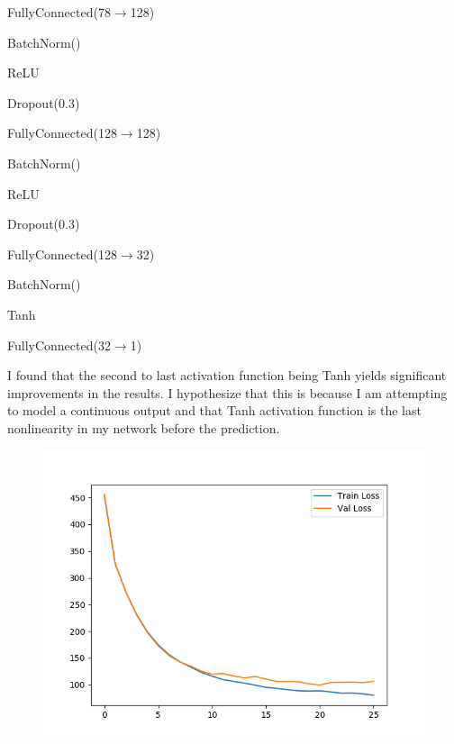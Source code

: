 \documentclass[12pt]{article}
\newcommand{\ra}{\ensuremath{\rightarrow}}
\begin{document}
        \begin{center}
            FullyConnected(78$\ra$128)

            BatchNorm()

            ReLU

            Dropout(0.3)

            FullyConnected(128$\ra$128)

            BatchNorm()

            ReLU

            Dropout(0.3)

            FullyConnected(128$\ra$32)

            BatchNorm()

            Tanh

            FullyConnected(32$\ra$1)

        \end{center}

    I found that the second to last activation function being Tanh yields significant improvements in the results. I hypothesize that this is because I am attempting to model a continuous output and that Tanh activation function is the last nonlinearity in my network before the prediction.

    \begin{figure}[h!]
    \begin{center}
    \includegraphics[scale = 0.5]{"../../output/nn/train_val_loss"}

    \end{center}
    \end{figure}
\end{document}
